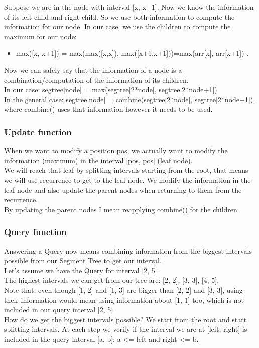 \documentclass{article}
\begin{document}
Suppose  we  are  in  the  node  with  interval  [x,  x+1].  Now  we  know  the  information  of  its  left  child  and  right  child.  So  we  use  both  information  to  compute  the  information  for  our  node.  In  our  case,  we  use  the  children  to  compute  the  maximum  for  our  node: 
\begin{itemize}
    \item max([x,  x+1])  =  max(max([x,x]), max([x+1,x+1]))=max(arr[x],  arr[x+1])
.
\end{itemize}
Now  we  can  safely  say  that  the  information  of  a  node  is  a  combination/computation  of  the  information  of  its  children. 
\\In  our  case:  segtree[node]  =  max(segtree[2*node],  segtree[2*node+1])
\\In  the  general  case:  segtree[node]  =  combine(segtree[2*node],  segtree[2*node+1]),  where  combine()  uses  that  information  however  it  needs  to  be  used.

\subsubsection{Update function}
When  we  want  to  modify  a  position  pos,  we  actually  want  to  modify  the  information  (maximum)  in  the  interval  [pos,  pos]  (leaf  node).  
\\We  will  reach  that  leaf  by  splitting  intervals  starting  from  the  root,  that  means  we  will  use  recurrence  to  get  to  the  leaf  node.  We  modify  the  information  in  the  leaf  node  and  also  update  the  parent  nodes  when  returning  to  them  from  the  recurrence.  
\\By  updating  the  parent  nodes  I  mean  reapplying  combine()  for  the  children.

\subsubsection{Query function}
Answering  a  Query  now  means  combining  information  from  the  biggest  intervals  possible  from  our  Segment  Tree  to  get  our  interval.  
\\Let’s  assume  we  have  the  Query  for  interval  [2,  5].
\\The  highest  intervals  we  can  get  from  our  tree  are:  [2,  2],  [3,  3],  [4,  5].  
\\Note  that,  even  though  [1,  2]  and  [1,  3]  are  bigger  than  [2,  2]  and  [3,  3],  using  their  information  would  mean  using  information  about  [1,  1]  too,  which  is  not  included  in  our  query  interval  [2,  5].  
\\How  do  we  get  the  biggest  intervals  possible?  We  start  from  the  root  and  start  splitting  intervals.  At  each  step  we  verify  if  the  interval  we  are  at  [left,  right]  is  included  in  the  query  interval  [a,  b]:  a  <=  left  and  right  <=  b.
\end{document}
